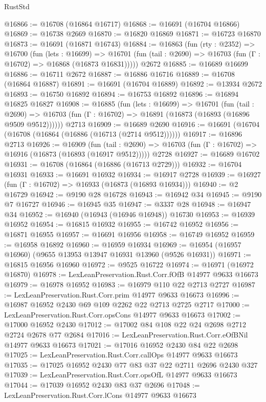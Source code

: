 \begin{lexlean}{RustStd}
\begin{coremodule}
@16866 := @16708 (@16864 @16717)
@16868 := @16691 (@16704 @16866)
@16869 := @16738 @2669
@16870 := @16820 @16869
@16871 := @16723 @16870
@16873 := @16691 (@16871 @16743)
@16884 := @16863
    (fun (rty : @2352) =>
    @16700
      (fun (lets : @16699) =>
      @16701 (fun (tail : @2690) => @16703 (fun (Γ : @16702) => @16868 (@16873 @16831)))))
    @2672
@16885 := @16689 @16699
@16886 := @16711 @2672
@16887 := @16886 @16716
@16889 := @16708 (@16864 @16887)
@16891 := @16691 (@16704 @16889)
@16892 := @13934 @2672
@16893 := @16750 @16892
@16894 := @16753 @16892
@16896 := @16894 @16825 @16827
@16908 := @16885
    (fun (lets : @16699) =>
    @16701
      (fun (tail : @2690) =>
      @16703 (fun (Γ : @16702) => @16891 (@16873 (@16893 (@16896 @9509 @9512))))))
    @2713
@16909 := @16689 @2690
@16916 := @16691 (@16704 (@16708 (@16864 (@16886 (@16713 (@2714 @9512))))))
@16917 := @16896 @2713
@16926 := @16909
    (fun (tail : @2690) => @16703 (fun (Γ : @16702) => @16916 (@16873 (@16893 (@16917 @9512)))))
    @2728
@16927 := @16689 @16702
@16931 := @16708 (@16864 (@16886 (@16713 @2729)))
@16932 := @16704 @16931
@16933 := @16691 @16932
@16934 := @16917 @2728
@16939 := @16927 (fun (Γ : @16702) => @16933 (@16873 (@16893 @16934)))
@16940 := @2 @16729
@16942 := @9190 @28 @16728
@16943 := @16942 @34
@16945 := @9190 @7 @16727
@16946 := @16945 @35
@16947 := @3337 @28
@16948 := @16947 @34
@16952 := @16940 (@16943 (@16946 @16948)) @16730
@16953 := @16939 @16952
@16954 := @16815 @16932
@16955 := @16742 @16952
@16956 := @16871 @16955
@16957 := @16691 @16956
@16958 := @16749 @16952
@16959 := @16958 @16892
@16960 := @16959 @16934
@16969 := @16954 (@16957 @16960) (@9655 @13953 @13947 @16931 @13960 (@9526 @16931))
@16971 := @16815 @16956 @16960
@16972 := @9525 @16722
@16974 := @16971 (@16972 @16870)
@16978 := LexLeanPreservation.Rust.Corr.fOfB @14977 @9633 @16673
@16979 := @16978 @16952
@16983 := @16979 @110 @22 @2713 @2727
@16987 := LexLeanPreservation.Rust.Corr.prim @14977 @9633 @16673
@16996 := @16987 @16952 @2430 @69 @109 @2262 @22 @2713 @2725 @2717
@17000 := LexLeanPreservation.Rust.Corr.opsCons @14977 @9633 @16673
@17002 := @17000 @16952 @2430
@17012 := @17002 @84 @108 @22 @24 @2698 @2712 @2724 @2678 @77 @2684
@17016 := LexLeanPreservation.Rust.Corr.eOfBNil @14977 @9633 @16673
@17021 := @17016 @16952 @2430 @84 @22 @2698
@17025 := LexLeanPreservation.Rust.Corr.callOps @14977 @9633 @16673
@17035 := @17025 @16952 @2430 @77 @83 @37 @22 @2711 @2696 @2430 @327
@17039 := LexLeanPreservation.Rust.Corr.opsOfL @14977 @9633 @16673
@17044 := @17039 @16952 @2430 @83 @37 @2696
@17048 := LexLeanPreservation.Rust.Corr.lCons @14977 @9633 @16673

\end{coremodule}
\end{lexlean}
